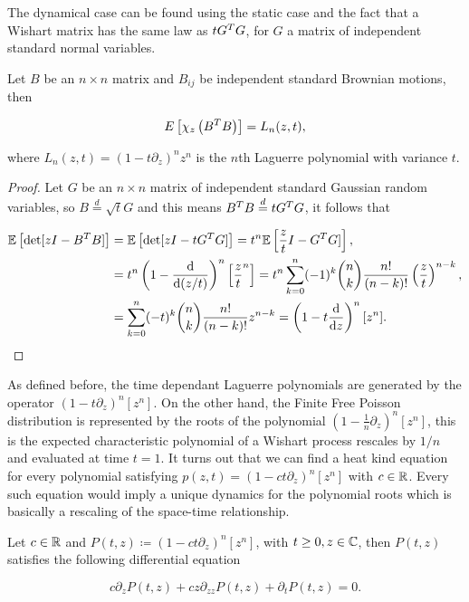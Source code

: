     The dynamical case can be found using the static case and the fact that a Wishart matrix has the same law as $tG^TG$, for $G$ a matrix of independent standard normal variables.

\begin{theorem}
    Let $B$ be an $n\times n$ matrix and $B_{ij}$ be independent standard Brownian motions, then 

    \begin{equation*}
        E\left[ \chi_z\left( B^TB\right) \right] = L_n(z,t),
    \end{equation*}

    \noindent where $L_n(z,t) = \left( 1 - t\partial_z \right)^n z^n$ is the $n$th Laguerre polynomial with variance $t$.
\end{theorem}

\begin{proof}
    Let $G$ be an $n\times n$ matrix of independent standard Gaussian random variables, so $B \overset{d}{=} \sqrt{t}G$ and this means $B^TB \overset{d}{=} t G^T G$, it follows that

    \begin{align*}
        \mathbb E \left[ \det[zI - B^T B] \right] &= \mathbb E \left[ \det[zI - t G^T G] \right] = t^n \mathbb E \left[ \frac zt I - G^TG] \right], \\
        &= t^n \left(1 - \frac{\mathrm d }{\mathrm d (z/t)}\right)^n\left[ \frac{z}{t}^n\right] = t^n\sum_{k=0}^n (-1)^k \binom nk \frac{n!}{(n-k)!} \left(\frac zt\right)^{n-k},\\
        &= \sum_{k=0}^n (-t)^k \binom nk \frac{n!}{(n-k)!} z^{n-k} = \left( 1 - t\frac{\mathrm d}{\mathrm d z} \right)^n [z^n].
    \end{align*}
\end{proof}

    As defined before, the time dependant Laguerre polynomials are generated by the operator $(1-t\partial_z)^{n}[z^n]$. On the other hand, the Finite Free Poisson distribution is represented by the roots of the polynomial $(1-\frac1n\partial_z)^{n}[z^n]$, this is the expected characteristic polynomial of a Wishart process rescales by $1/n$ and evaluated at time $t=1$. It turns out that we can find a heat kind equation for every polynomial satisfying $p(z,t)=(1-ct\partial_z)^n[z^n]$ with $c \in\mathbb R$. Every such equation would imply a unique dynamics for the polynomial roots which is basically a rescaling of the space-time relationship.

\begin{theorem}
    Let $c\in \mathbb R$ and $P(t,z) \coloneqq \left( 1 - ct\partial_z \right)^n [z^n]$, with $t\ge 0, z \in \mathbb C$, then $P(t,z)$ satisfies the following differential equation

    \begin{equation*} 
        c\partial_z P(t,z) + cz  \partial_{zz}P(t,z) + \partial_t P(t,z) = 0.
     \end{equation*}

\end{theorem}

